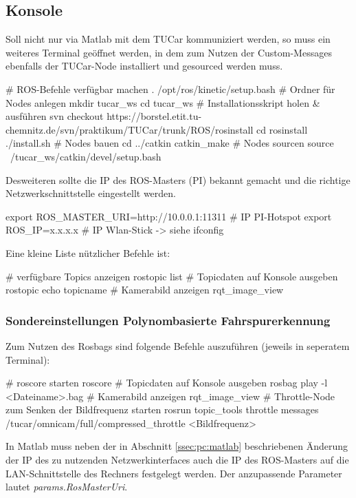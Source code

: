 \documentclass[
	11pt,			%
	a4paper,		%
	oneside,		%
	german,			%
	titlepage		%
]{scrartcl}			%
\begin{document}
\subsection{Konsole}
Soll nicht nur via Matlab mit dem TUCar kommuniziert werden, so muss ein weiteres Terminal geöffnet werden, in dem zum Nutzen der Custom-Messages ebenfalls der TUCar-Node installiert und gesourced werden muss.
\begin{she}
# ROS-Befehle verfügbar machen
. /opt/ros/kinetic/setup.bash
# Ordner für Nodes anlegen
mkdir tucar_ws
cd tucar_ws
# Installationsskript holen & ausführen
svn checkout 
https://borstel.etit.tu-chemnitz.de/svn/praktikum/TUCar/trunk/ROS/rosinstall
cd rosinstall
./install.sh
# Nodes bauen
cd ../catkin
catkin_make
# Nodes sourcen
source ~/tucar_ws/catkin/devel/setup.bash
\end{she}

\noindent Desweiteren sollte die IP des ROS-Masters (PI) bekannt gemacht und die richtige Netzwerkschnittstelle eingestellt werden.
\begin{she}
export ROS_MASTER_URI=http://10.0.0.1:11311 # IP PI-Hotspot
export ROS_IP=x.x.x.x # IP Wlan-Stick -> siehe ifconfig
\end{she}

\noindent Eine kleine Liste nützlicher Befehle ist:
\begin{she}
# verfügbare Topics anzeigen
rostopic list
# Topicdaten auf Konsole ausgeben
rostopic echo topicname
# Kamerabild anzeigen
rqt_image_view
\end{she}

\subsubsection{Sondereinstellungen Polynombasierte Fahrspurerkennung}
Zum Nutzen des Rosbags sind folgende Befehle auszuführen (jeweils in seperatem Terminal):
\begin{she}
# roscore starten
roscore
# Topicdaten auf Konsole ausgeben
rosbag play -l <Dateiname>.bag
# Kamerabild anzeigen
rqt_image_view
# Throttle-Node zum Senken der Bildfrequenz starten
rosrun topic_tools throttle messages /tucar/omnicam/full/compressed_throttle <Bildfrequenz>
\end{she}

In Matlab muss neben der in Abschnitt \ref{ssec:pc:matlab} beschriebenen Änderung der IP des zu nutzenden Netzwerkinterfaces auch die IP des ROS-Masters auf die LAN-Schnittstelle des Rechners festgelegt werden. Der anzupassende Parameter lautet \emph{params.RosMasterUri}.
\end{document}
